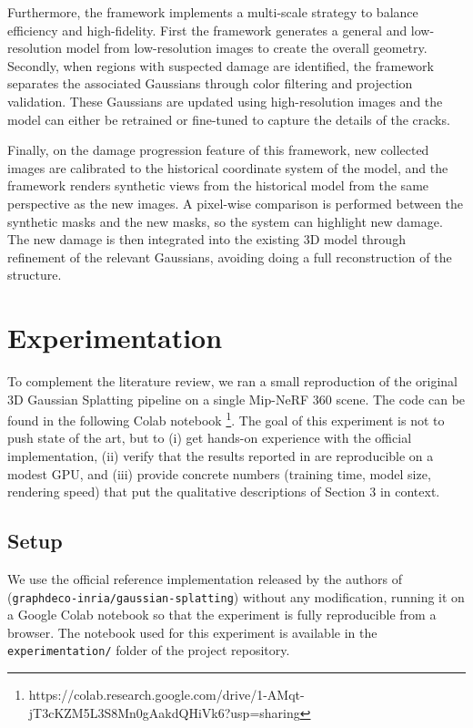 \documentclass[
	a4paper, %
	10pt, %
	unnumberedsections, %
	twoside, %
]{LTJournalArticle}
\begin{document}
Furthermore, the framework implements a multi-scale strategy to balance efficiency and high-fidelity. First the framework generates a general and low-resolution model from low-resolution images to create the overall geometry. Secondly, when regions with suspected damage are identified, the framework separates the associated Gaussians through color filtering and projection validation. These Gaussians are updated using high-resolution images and the model can either be retrained or fine-tuned to capture the details of the cracks.

Finally, on the damage progression feature of this framework, new collected images are calibrated to the historical coordinate system of the model, and the framework renders synthetic views from the historical model from the same perspective as the new images. A pixel-wise comparison is performed between the synthetic masks and the new masks, so the system can highlight new damage. The new damage is then integrated into the existing 3D model through refinement of the relevant Gaussians, avoiding doing a full reconstruction of the structure.


\section{Experimentation}

To complement the literature review, we ran a small reproduction of the original 3D Gaussian Splatting pipeline on a single Mip-NeRF 360 scene. The code can be found in the following Colab notebook \footnote{https://colab.research.google.com/drive/1-AMqt-jT3cKZM5L3S8Mn0gAakdQHiVk6?usp=sharing}. The goal of this experiment is not to push state of the art, but to (i) get hands-on experience with the official implementation, (ii) verify that the results reported in \cite{kerbl20233dgs} are reproducible on a modest GPU, and (iii) provide concrete numbers (training time, model size, rendering speed) that put the qualitative descriptions of Section 3 in context.

\subsection{Setup}

We use the official reference implementation released by the authors of \cite{kerbl20233dgs} (\texttt{graphdeco-inria/gaussian-splatting}) without any modification, running it on a Google Colab notebook so that the experiment is fully reproducible from a browser. The notebook used for this experiment is available in the \texttt{experimentation/} folder of the project repository.
\end{document}
